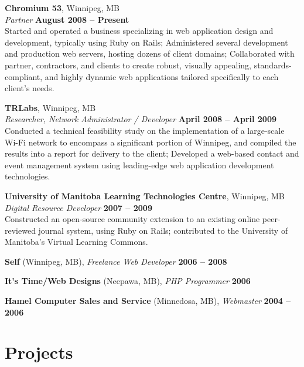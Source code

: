 \documentclass[margin,line,letterpaper]{resume}
\begin{document}
\begin{resume}
  {\bf Chromium 53}, Winnipeg, MB \vspace{2mm}\\\vspace{1mm}%
  {\sl Partner} \hfill {\bf August 2008 -- Present}\\
  Started and operated a business specializing in web application design and development, 
  typically using Ruby on Rails; Administered several development and production web servers,
  hosting dozens of client domains; Collaborated with partner, contractors, and clients to create
  robust, visually appealing, standards-compliant, and highly dynamic web applications tailored  
  specifically to each client's needs.

 {\bf TRLabs}, Winnipeg, MB \vspace{2mm}\\\vspace{1mm}%
  {\sl Researcher, Network Administrator / Developer} \hfill {\bf April 2008 -- April 2009}\\
  Conducted a technical feasibility study on the implementation of a large-scale Wi-Fi
  network to encompass a significant portion of Winnipeg, and compiled the results into a report
  for delivery to the client; Developed a web-based contact and event management system using 
  leading-edge web application development technologies.

  {\bf University of Manitoba Learning Technologies Centre}, Winnipeg, MB \vspace{2mm}\\\vspace{1mm}%
  {\sl Digital Resource Developer} \hfill {\bf 2007 -- 2009}\\
  Constructed an open-source community extension to an existing online peer-reviewed journal 
  system, using Ruby on Rails; contributed to the University of Manitoba's Virtual Learning Commons.

  {\bf Self} (Winnipeg, MB), {\sl Freelance Web Developer} \hfill {\bf 2006 -- 2008}

  {\bf It's Time/Web Designs} (Neepawa, MB), {\sl PHP Programmer} \hfill {\bf 2006}

  {\bf Hamel Computer Sales and Service} (Minnedosa, MB), {\sl Webmaster} \hfill {\bf 2004 -- 2006}

  \section{\mysidestyle Projects}


\end{resume}
\end{document}
